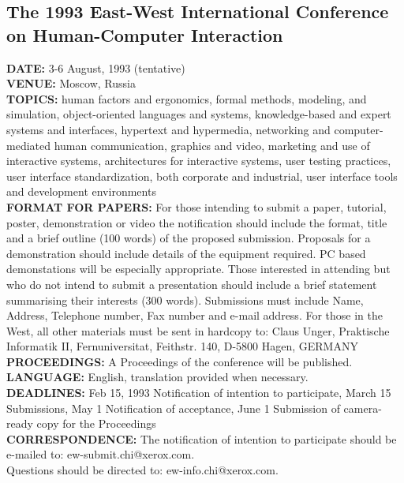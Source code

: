 \subsection{The 1993 East-West International Conference on Human-Computer Interaction}
{\bf DATE:} 3-6 August, 1993 (tentative)\\
{\bf VENUE:} Moscow, Russia\\
{\bf TOPICS:} human factors and ergonomics, formal methods, modeling,
and simulation, object-oriented languages and systems, knowledge-based
and expert systems and interfaces, hypertext and hypermedia,
networking and computer-mediated human communication, graphics and
video, marketing and use of interactive systems, architectures for
interactive systems, user testing practices, user interface
standardization, both corporate and industrial, user interface tools
and development environments \\
{\bf FORMAT FOR PAPERS:}  For those intending
to submit a paper, tutorial, poster, demonstration or video the
notification should include the format, title and a brief outline (100
words) of the proposed submission. Proposals for a demonstration
should include details of the equipment required.  PC based
demonstations will be especially appropriate.  Those interested in
attending but who do not intend to submit a presentation should
include a brief statement summarising their interests (300 words).
Submissions must include Name, Address, Telephone number, Fax number
and e-mail address. For those in the West, all other materials must be sent in hardcopy to: 
Claus Unger,
Praktische Informatik II,
Fernuniversitat,
Feithstr. 140,
D-5800 Hagen,
GERMANY\\
{\bf PROCEEDINGS:} A Proceedings of the conference will be published.\\
{\bf LANGUAGE:} English, translation provided when necessary.  \\
{\bf DEADLINES:} 
Feb 15, 1993    Notification of intention to participate,
March 15        Submissions,
May 1           Notification of acceptance,
June 1          Submission of camera-ready copy for the Proceedings\\
{\bf CORRESPONDENCE:} The notification of intention to participate
should be e-mailed to: ew-submit.chi@xerox.com. \\
Questions should be directed to:  ew-info.chi@xerox.com.\\

